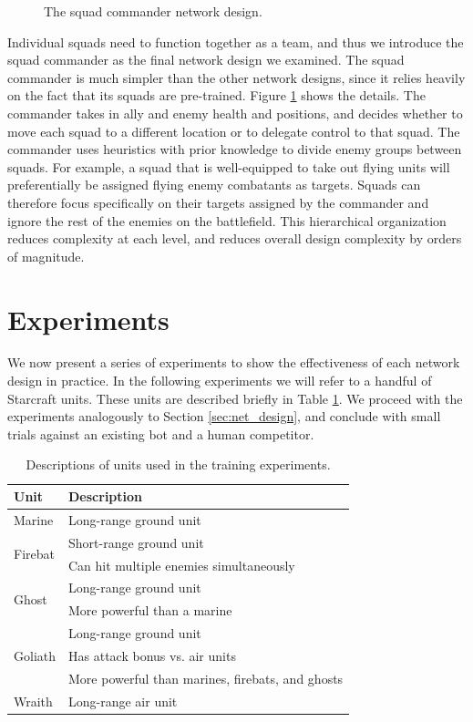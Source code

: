\documentclass[a4paper]{article}
\begin{document}
\begin{figure}

\caption{The squad commander network design.}
\label{fig:quad_commander_design}
\end{figure}

Individual squads need to function together as a team, and thus we introduce the squad commander as the final network design we examined. The squad commander is much simpler than the other network designs, since it relies heavily on the fact that its squads are pre-trained. Figure \ref{fig:quad_commander_design} shows the details. The commander takes in ally and enemy health and positions, and decides whether to move each squad to a different location or to delegate control to that squad. The commander uses heuristics with prior knowledge to divide enemy groups between squads. For example, a squad that is well-equipped to take out flying units will preferentially be assigned flying enemy combatants as targets. Squads can therefore focus specifically on their targets assigned by the commander and ignore the rest of the enemies on the battlefield. This hierarchical organization reduces complexity at each level, and reduces overall design complexity by orders of magnitude.

\section{Experiments}
\label{sec:exp}

We now present a series of experiments to show the effectiveness of each network design in practice. In the following experiments we will refer to a handful of Starcraft units. These units are described briefly in Table \ref{tab:units}. We proceed with the experiments analogously to Section \ref{sec:net_design}, and conclude with small trials against an existing bot and a human competitor.

\begin{table}
\centering
\begin{tabular}{|l|l|}
	\hline
	{\bf Unit} & {\bf Description} \\ \hline
	Marine & Long-range ground unit \\ \hline
	\multirow{2}{*}{Firebat} & Short-range ground unit \\
	& Can hit multiple enemies simultaneously \\ \hline
	\multirow{2}{*}{Ghost} & Long-range ground unit \\
	& More powerful than a marine\\ \hline
	\multirow{3}{*}{Goliath} & Long-range ground unit \\
	& Has attack bonus vs. air units \\
	& More powerful than marines, firebats, and ghosts \\ \hline
	Wraith & Long-range air unit \\ \hline
\end{tabular}
\caption{Descriptions of units used in the training experiments.}
\label{tab:units}
\end{table}
	
\end{document}

